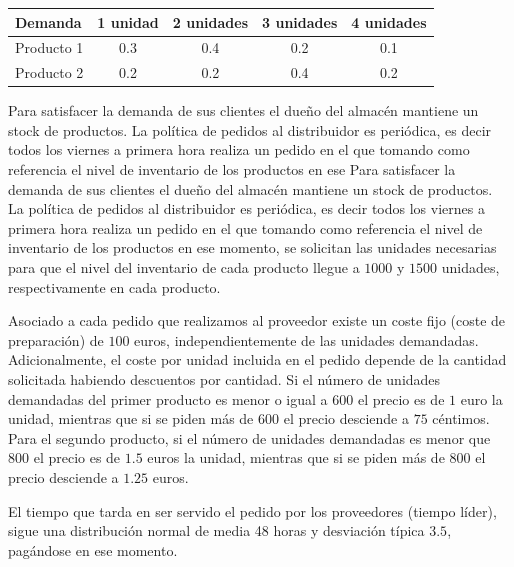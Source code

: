 \documentclass[a4paper,12pt]{article}
\begin{document}
	
	\begin{table}[H]

		\centering

		\begin{tabular}{|l||c|c|c|c|}

			\hline

			Demanda    & 1 unidad & 2 unidades & 3 unidades & 4 unidades \\ \hline \hline

			Producto 1 & 0.3      & 0.4        & 0.2        & 0.1        \\ \hline

			Producto 2 & 0.2      & 0.2        & 0.4        & 0.2        \\ \hline

		\end{tabular}

	\end{table}

	
	Para satisfacer la demanda de sus clientes el dueño del almacén mantiene un stock de productos. La política de pedidos al distribuidor es periódica, es decir todos los viernes a primera hora realiza un pedido en el que tomando como referencia el nivel de inventario de los productos en ese Para satisfacer la demanda de sus clientes el dueño del almacén mantiene un stock de productos. La política de pedidos al distribuidor es periódica, es decir todos los viernes a primera hora realiza un pedido en el que tomando como referencia el nivel de inventario de los productos en ese momento, se solicitan las unidades necesarias para que el nivel del inventario de cada producto llegue a $1000$ y $1500$ unidades, respectivamente en cada producto.

	
	Asociado a cada pedido que realizamos al proveedor existe un coste fijo (coste de preparación) de $100$ euros, independientemente de las unidades demandadas. Adicionalmente, el coste por unidad incluida en el pedido depende de la cantidad solicitada habiendo descuentos por cantidad. Si el número de unidades demandadas del primer producto es menor o igual a $600$ el precio es de $1$ euro la unidad, mientras que si se piden más de $600$ el precio desciende a $75$ céntimos. Para el segundo producto, si el número de unidades demandadas es menor que $800$ el precio es de $1.5$ euros la unidad, mientras que si se piden más de $800$ el precio desciende a $1.25$ euros.

	
	El tiempo que tarda en ser servido el pedido por los proveedores (tiempo líder), sigue una distribución normal de media 48 horas y desviación típica $3.5$, pagándose en ese momento.
\end{document}
